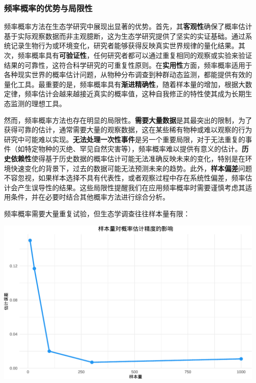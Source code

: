 \documentclass[
]{book}
\begin{document}
\hypertarget{ux9891ux7387ux6982ux7387ux7684ux4f18ux52bfux4e0eux5c40ux9650ux6027}{%
\subsubsection{频率概率的优势与局限性}\label{ux9891ux7387ux6982ux7387ux7684ux4f18ux52bfux4e0eux5c40ux9650ux6027}}

频率概率方法在生态学研究中展现出显著的优势。首先，其\textbf{客观性}确保了概率估计基于实际观察数据而非主观臆断，这为生态学研究提供了坚实的实证基础。通过系统记录生物行为或环境变化，研究者能够获得反映真实世界规律的量化结果。其次，频率概率具有\textbf{可验证性}，任何研究者都可以通过重复相同的观察或实验来验证结果的可靠性，这符合科学研究的可重复性原则。在\textbf{实用性}方面，频率概率适用于各种现实世界的概率估计问题，从物种分布调查到种群动态监测，都能提供有效的量化工具。最重要的是，频率概率具有\textbf{渐进精确性}，随着样本量的增加，根据大数定律，频率估计会越来越接近真实的概率值，这种自我修正的特性使其成为长期生态监测的理想工具。

然而，频率概率方法也存在明显的局限性。\textbf{需要大量数据}是其最突出的限制，为了获得可靠的估计，通常需要大量的观察数据，这在某些稀有物种或难以观察的行为研究中可能难以实现。\textbf{无法处理一次性事件}是另一个重要局限，对于无法重复的事件（如特定物种的灭绝、罕见自然灾害等），频率概率难以提供有意义的估计。\textbf{历史依赖性}使得基于历史数据的概率估计可能无法准确反映未来的变化，特别是在环境快速变化的背景下，过去的数据可能无法预测未来的趋势。此外，\textbf{样本偏差}问题不容忽视，如果样本选择不具有代表性，或者观察过程中存在系统性偏差，频率估计会产生误导性的结果。这些局限性提醒我们在应用频率概率时需要谨慎考虑其适用条件，并在必要时结合其他概率方法进行综合分析。

频率概率需要大量重复试验，但生态学调查往往样本量有限：

\begin{center}\includegraphics[width=0.8\linewidth]{ecological-statistics_files/figure-latex/unnamed-chunk-6-1} \end{center}
\end{document}
